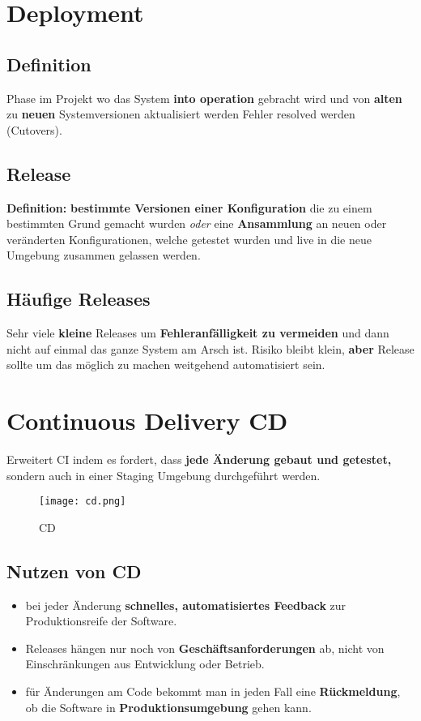 \documentclass{book}
\begin{document}
    \section{Deployment}
    \subsection{Definition}
    Phase im Projekt wo das System \textbf{into operation} gebracht wird und von \textbf{alten} zu \textbf{neuen} Systemversionen aktualisiert werden Fehler resolved werden (Cutovers).
    \subsection{Release}
    \textbf{Definition:} \textbf{bestimmte Versionen einer Konfiguration} die zu einem bestimmten Grund gemacht wurden \textit{oder} eine \textbf{Ansammlung} an neuen oder veränderten Konfigurationen, welche getestet wurden und live in die neue Umgebung zusammen gelassen werden.
    \subsection{Häufige Releases}
    Sehr viele \textbf{kleine} Releases um \textbf{Fehleranfälligkeit zu vermeiden} und dann nicht auf einmal das ganze System am Arsch ist. Risiko bleibt klein, \textbf{aber} Release sollte um das möglich zu machen weitgehend automatisiert sein.

    \section{Continuous Delivery CD}
    Erweitert CI indem es fordert, dass \textbf{jede Änderung gebaut und getestet,} sondern auch in einer Staging Umgebung durchgeführt werden.
    \begin{figure}[H]
        \centering
        \texttt{[image: cd.png]}
        \caption{CD}
        \label{fig:enter-label}
    \end{figure}
    \subsection{Nutzen von CD}
    \begin{itemize}
        \item bei jeder Änderung \textbf{schnelles, automatisiertes Feedback} zur Produktionsreife der Software.
        \item Releases hängen nur noch von \textbf{Geschäftsanforderungen} ab, nicht von Einschränkungen aus Entwicklung oder Betrieb.
        \item für Änderungen am Code bekommt man in jeden Fall eine \textbf{Rückmeldung}, ob die Software in \textbf{Produktionsumgebung} gehen kann.
    \end{itemize}
\end{document}
